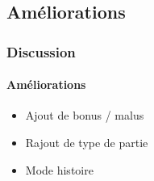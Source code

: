 		
	\subsection{Améliorations}
		\begin{frame}
			\frametitle{Discussion}
			\framesubtitle{Améliorations}
			\begin{itemize}
				\item Ajout de bonus / malus
				\item Rajout de type de partie
				\item Mode histoire
			\end{itemize}
		\end{frame}
